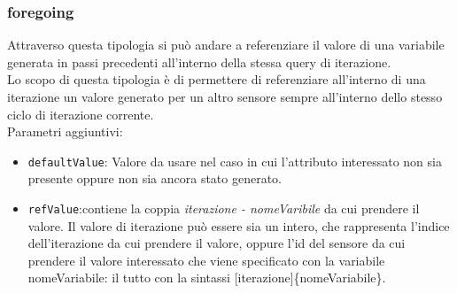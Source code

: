 \documentclass[12pt,a4paper,italian]{article}
\begin{document}
\subsubsection{foregoing} Attraverso questa tipologia si può andare a referenziare il valore di una variabile generata in passi precedenti all'interno della stessa query di iterazione.\\
Lo scopo di questa tipologia è di permettere di referenziare all'interno di una iterazione un valore generato per un altro sensore sempre all'interno dello stesso ciclo di iterazione corrente.\\
Parametri aggiuntivi:
\begin{itemize}
	\item \texttt{defaultValue}: Valore da usare nel caso in cui l'attributo interessato non sia presente oppure non sia ancora stato generato.
	\item \texttt{refValue}:contiene la coppia \emph{iterazione - nomeVaribile} da cui prendere il valore. Il valore di iterazione può essere sia un intero, che rappresenta l'indice dell'iterazione 
	da cui prendere il valore, oppure l'id del sensore da cui prendere il valore interessato che viene specificato con la variabile nomeVariabile: il tutto con la sintassi \@[iterazione]\{nomeVariabile\}.
\end{itemize}
\end{document}
